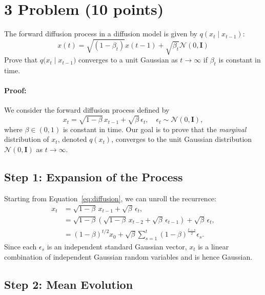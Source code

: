 \documentclass{article}
\begin{document}
\FloatBarrier

\newpage
\section*{3 Problem (10 points)}

The forward diffusion process in a diffusion model is given by $q\left(x_t \mid x_{t-1}\right)$:
\[
x(t)=\sqrt{\left(1-\beta_t\right)} x(t-1)+\sqrt{\beta_t} \mathcal{N}(0, \mathbf{I})
\]
Prove that \(q\bigl(x_t \mid x_{t-1}\bigr)\) converges to a unit Gaussian as \(t \to \infty\) if \(\beta_t\) is constant in time. 

\paragraph{Proof:}
We consider the forward diffusion process defined by
\begin{equation}
  x_t = \sqrt{1-\beta}\, x_{t-1} + \sqrt{\beta}\, \epsilon_t, \quad \epsilon_t \sim \mathcal{N}(0, \mathbf{I}),
  \label{eq:diffusion}
\end{equation}
where $\beta \in (0,1)$ is constant in time. Our goal is to prove that the \emph{marginal} distribution of $x_t$, denoted $q(x_t)$, converges to the unit Gaussian distribution $\mathcal{N}(0, \mathbf{I})$ as $t \to \infty$.

\subsection*{Step 1: Expansion of the Process}

Starting from Equation~\eqref{eq:diffusion}, we can unroll the recurrence:
\[
\begin{aligned}
  x_t &= \sqrt{1-\beta}\, x_{t-1} + \sqrt{\beta}\, \epsilon_t,\\[1mm]
      &= \sqrt{1-\beta}\left(\sqrt{1-\beta}\, x_{t-2} + \sqrt{\beta}\, \epsilon_{t-1}\right) + \sqrt{\beta}\, \epsilon_t,\\[1mm]
      &= (1-\beta)^{t/2} x_0 + \sqrt{\beta}\sum_{s=1}^{t} (1-\beta)^{\frac{t-s}{2}} \epsilon_s.
\end{aligned}
\]
Since each $\epsilon_s$ is an independent standard Gaussian vector, $x_t$ is a linear combination of independent Gaussian random variables and is hence Gaussian.

\subsection*{Step 2: Mean Evolution}
\end{document}
